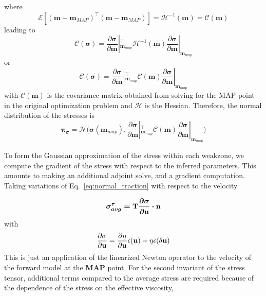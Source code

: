 \documentclass[12pt]{article}
\newcommand{\mm}{{\ensuremath{\boldsymbol{m}}}}
\newcommand{\ppi}{{\ensuremath{\boldsymbol{\pi}}}}
\newcommand{\ssigma}{{\ensuremath{\boldsymbol{\sigma}}}}
\begin{document}
{\begin{equation}
\end{equation}
where 
\begin{equation}
  \mathcal E[(\mm-\mm_{MAP})^\intercal(\mm-\mm_{MAP})] = \mathcal H^{-1}(\mm) = \mathcal C(\mm)
  \end{equation}
leading to
\begin{equation}
\mathcal C(\ssigma) = \frac{\partial\ssigma}{\partial \mm}|_{\mm_{map}}^\intercal \mathcal H^{-1}(\mm)\frac{\partial\ssigma}{\partial \mm}|_{\mm_{map}}
\end{equation}
or 
\begin{equation}
\mathcal C(\ssigma) = \frac{\partial\ssigma}{\partial \mm}|_{\mm_{map}}^\intercal \mathcal C(\mm)\frac{\partial\ssigma}{\partial \mm}|_{\mm_{map}}
\end{equation}
with $\mathcal C(\mm)$ is the covariance matrix obtained from solving for the MAP point in the original optimization problem
and $\mathcal H$ is the Hessian.
Therefore, the normal distribution of the stresses is
\begin{equation}
  \ppi_{\ssigma} = \mathcal N\big(\ssigma(\mm_{map}), \frac{\partial\ssigma}{\partial \mm}|_{\mm_{map}}^\intercal \mathcal C(\mm)\frac{\partial\ssigma}{\partial \mm}|_{\mm_{map}}\big)
\end{equation}

To form the Gaussian approximation of the stress within each weakzone, we compute the gradient of the stress with respect to the inferred parameters. This amounts to making an additional adjoint solve, and a gradient computation. Taking variations of Eq.~\eqref{eq:normal_traction} with respect to the velocity

\begin{equation}
\sigma^{\tau}_{avg}=\boldmath{\mathrm{T}}\frac{\partial\sigma}{\partial \textbf u}\cdot \textbf n
\end{equation}
with
\begin{equation}
\frac{\partial\sigma}{\partial \textbf u} = \frac{\partial \eta}{\partial \textbf u}\overset{.}{\epsilon}(\textbf u)
                                            + \eta\overset{.}{\epsilon}(\delta \textbf u)
\end{equation}
This is just an application of the linearized Newton operator to the velocity of the forward model at the \textbf{MAP} point.
For the second invariant of the stress tensor, additional terms compared to the average stress are required because of the dependence of the stress on the effective viscosity,

}
\end{document}
